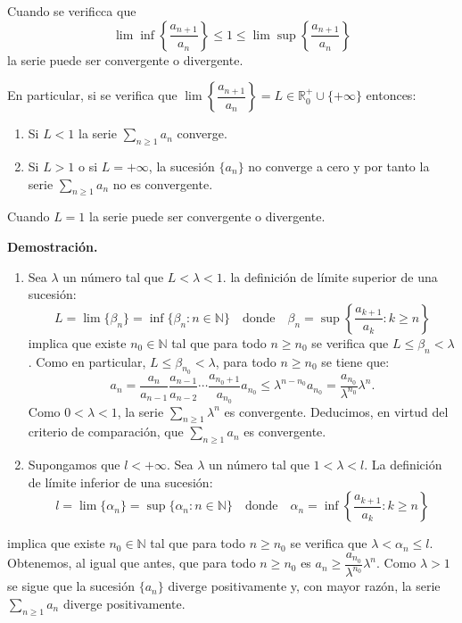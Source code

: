 \documentclass[10pt,a4paper]{article}
\begin{document}
	Cuando se verificca que 
	$$ \lim \inf \left\{\dfrac{a_{n+1}}{a_n}\right\} \leq 1 \leq \lim \sup \left\{\dfrac{a_{n+1}}{a_n}\right\}$$
	la serie puede ser convergente o divergente.
	
	En particular, si se verifica que $\lim \left\{\dfrac{a_{n+1}}{a_n}\right\} = L \in \mathbb{R}_0 ^+ \cup \{+ \infty\}$ entonces: 
	\begin{enumerate}[label = \alph*]
		\item Si $L < 1$ la serie $\sum_{n \geq 1} a_n$ converge.
		\item Si $L > 1$ o si $L = + \infty$, la sucesión $\{a_n\}$ no converge a cero y por tanto la serie $\sum_{n \geq 1}a_n$ no es convergente.
	\end{enumerate}

	Cuando $L = 1$ la serie puede ser convergente o divergente.
	
	\textbf{Demostración. } 
	\begin{enumerate}[label = \alph*)]
		\item Sea $\lambda$ un número tal que $L < \lambda < 1$. la definición de límite superior de una sucesión:
		$$L = \lim\{\beta_n\} = \inf\{\beta_n:n \in \mathbb{N}\} \quad \text{donde} \quad \beta_n = \sup\left\{\dfrac{a_{k+1}}{a_k}: k \geq n\right\}$$
		implica que existe $n_0 \in \mathbb{N}$ tal que para todo $n \geq n_0$ se verifica que $L \leq \beta_n < \lambda$. Como en particular, $L \leq \beta_{n_0} < \lambda$, para todo $n \geq n_0$ se tiene que:
		$$a_n = \dfrac{a_n}{a_{n-1}}\dfrac{a_{n-1}}{a_{n-2}} \cdots \dfrac{a_{n_0 + 1}}{a_{n_0}} a_{n_0} \leq \lambda^{n - n_0} a_{n_0} = \dfrac{a_{n_0}}{\lambda^{n_0}} \lambda ^n.$$
		Como $0 < \lambda < 1$, la serie $\displaystyle \sum_{n \geq 1} \lambda^n$ es convergente. Deducimos, en virtud del criterio de comparación, que $\displaystyle \sum_{n \geq 1} a_n$ es convergente.
		\item Supongamos que $l < + \infty$. Sea $\lambda$ un número tal que $ 1 < \lambda < l$. La definición de límite inferior de una sucesión:
		$$l = \lim\{\alpha_n\} = \sup\{\alpha_n:n \in \mathbb{N}\} \quad \text{donde} \quad \alpha_n = \inf\left\{\dfrac{a_{k+1}}{a_k}: k \geq n\right\}$$
	\end{enumerate}
	implica que existe $n_0 \in \mathbb{N}$ tal que para todo $n \geq n_0$ se verifica que $\lambda < \alpha_n \leq l$. Obtenemos, al igual que antes, que para todo $n \geq n_0$ es $a_n \geq \dfrac{a_{n_0}}{\lambda^{n_0}} \lambda^n$. Como $\lambda > 1$ se sigue que la sucesión $\{a_n\}$ diverge positivamente y, con mayor razón, la serie $\displaystyle\sum_{n \geq 1} a_n$ diverge positivamente.
	
\end{document}
